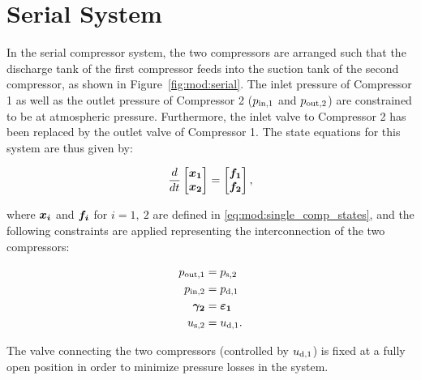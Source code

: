 \section{Serial System}
\label{sec:mod:serial}

In the serial compressor system, the two compressors are arranged such that the discharge tank of the first compressor feeds into the suction tank of the second compressor, as shown in Figure~\ref{fig:mod:serial}.
The inlet pressure of Compressor 1 as well as the outlet pressure of Compressor 2 ($p_\text{in,1}$ and $p_\text{out,2}$) are constrained to be at atmospheric pressure.
Furthermore, the inlet valve to Compressor 2 has been replaced by the outlet valve of Compressor 1. The state equations for this system are thus given by:

\begin{equation}
  \frac{d}{dt}
  \begin{bmatrix}
    \bm{x_1}\\
    \bm{x_2}\\
  \end{bmatrix} =
  \begin{bmatrix}
    \bm{f_1}\\
    \bm{f_2}
  \end{bmatrix},
  \label{eq:mod:serial-state-eq}
\end{equation}

where $\bm{x_i}$ and $\bm{f_i}$ for $i=1,\ 2$ are defined in \eqref{eq:mod:single_comp_states}, and the following constraints are applied representing the interconnection of the two compressors:

\begin{equation}
  \begin{split}
    p_\text{out,1} & = p_\text{s,2}\\
    p_\text{in,2} & = p_\text{d,1}\\
    \bm{\gamma_2} & = \bm{\varepsilon_1}\\
    u_\text{s,2} & = u_\text{d,1}.
  \end{split}
  \label{eq:mod:serial-constraints}
\end{equation}

The valve connecting the two compressors (controlled by $u_\text{d,1}$) is fixed at a fully open position in order to minimize pressure losses in the system.


